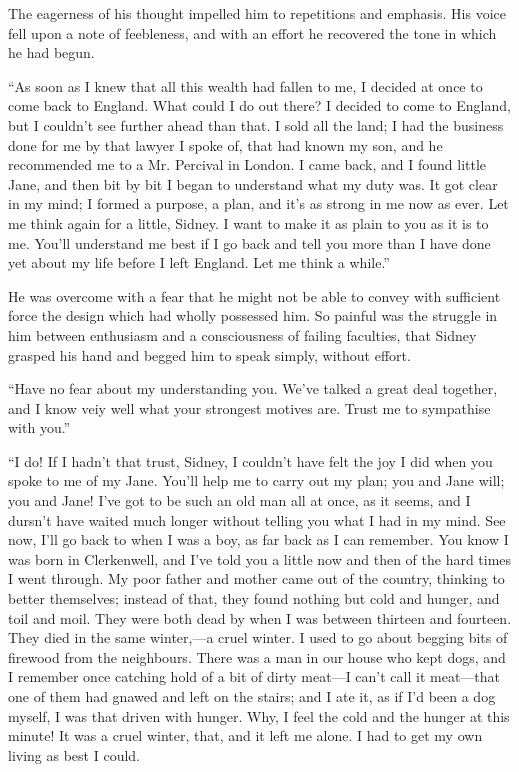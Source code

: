 The eagerness of his thought impelled him to repetitions and emphasis.
His voice fell upon a note of feebleness, and with an effort he
recovered the tone in which he had begun.

``As soon as I knew that all this wealth had fallen to me, I decided at
once to come back to England. What could I do out {}there? I decided to
come to England, but I couldn't see further ahead than that. I sold all
the land; I had the business done for me by that lawyer I spoke of, that
had known my son, and he recommended me to a Mr. Percival in London. I
came back, and I found little Jane, and then bit by bit I began to
understand what my duty was. It got clear in my mind; I formed a
purpose, a plan, and it's as strong in me now as ever. Let me think
again for a little, Sidney. I want to make it as plain to you as it is
to me. You'll understand me best if I go back and tell you more than I
have done yet about my life before I left England. Let me think a
while.''

He was overcome with a fear that he might not be able to convey with
sufficient force the design which had wholly possessed him. So painful
was the struggle in him between enthusiasm and a consciousness of
failing faculties, that Sidney grasped his hand and begged him to speak
simply, without effort.

{}``Have no fear about my understanding you. We've talked a great deal
together, and I know veiy well what your strongest motives are. Trust me
to sympathise with you.''

``I do! If I hadn't that trust, Sidney, I couldn't have felt the joy I
did when you spoke to me of my Jane. You'll help me to carry out my
plan; you and Jane will; you and Jane! I've got to be such an old man
all at once, as it seems, and I dursn't have waited much longer without
telling you what I had in my mind. See now, I'll go back to when I was a
boy, as far back as I can remember. You know I was born in Clerkenwell,
and I've told you a little now and then of the hard times I went
through. My poor father and mother came out of the country, thinking to
better themselves; instead of that, they found nothing but cold and
hunger, and toil and moil. They were both dead by when I was between
thirteen and fourteen. They died in the same winter,---a cruel winter. I
used to go about begging bits of firewood from the neighbours. {}There
was a man in our house who kept dogs, and I remember once catching hold
of a bit of dirty meat---I can't call it meat---that one of them had
gnawed and left on the stairs; and I ate it, as if I'd been a dog
myself, I was that driven with hunger. Why, I feel the cold and the
hunger at this minute! It was a cruel winter, that, and it left me
alone. I had to get my own living as best I could.


